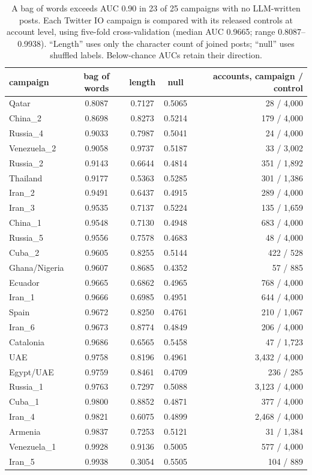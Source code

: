 \documentclass[10pt,a4paper]{article}
\begin{document}
\begin{table}[t]\centering\small
\begin{tabular}{lcccr}
\toprule
campaign & bag of words & length & null & accounts, campaign / control \\
\midrule
Qatar           & 0.8087 & 0.7127 & 0.5065 & 28 / 4,000 \\
China\_2        & 0.8698 & 0.8273 & 0.5214 & 179 / 4,000 \\
Russia\_4       & 0.9033 & 0.7987 & 0.5041 & 24 / 4,000 \\
Venezuela\_2    & 0.9058 & 0.9737 & 0.5187 & 33 / 3,002 \\
Russia\_2       & 0.9143 & 0.6644 & 0.4814 & 351 / 1,892 \\
Thailand        & 0.9177 & 0.5363 & 0.5285 & 301 / 1,386 \\
Iran\_2         & 0.9491 & 0.6437 & 0.4915 & 289 / 4,000 \\
Iran\_3         & 0.9535 & 0.7137 & 0.5224 & 135 / 1,659 \\
China\_1        & 0.9548 & 0.7130 & 0.4948 & 683 / 4,000 \\
Russia\_5       & 0.9556 & 0.7578 & 0.4683 & 48 / 4,000 \\
Cuba\_2         & 0.9605 & 0.8255 & 0.5144 & 422 / 528 \\
Ghana/Nigeria   & 0.9607 & 0.8685 & 0.4352 & 57 / 885 \\
Ecuador         & 0.9665 & 0.6862 & 0.4965 & 768 / 4,000 \\
Iran\_1         & 0.9666 & 0.6985 & 0.4951 & 644 / 4,000 \\
Spain           & 0.9672 & 0.8250 & 0.4761 & 210 / 1,067 \\
Iran\_6         & 0.9673 & 0.8774 & 0.4849 & 206 / 4,000 \\
Catalonia       & 0.9686 & 0.6565 & 0.5458 & 47 / 1,723 \\
UAE             & 0.9758 & 0.8196 & 0.4961 & 3,432 / 4,000 \\
Egypt/UAE       & 0.9759 & 0.8461 & 0.4709 & 236 / 285 \\
Russia\_1       & 0.9763 & 0.7297 & 0.5088 & 3,123 / 4,000 \\
Cuba\_1         & 0.9800 & 0.8852 & 0.4871 & 377 / 4,000 \\
Iran\_4         & 0.9821 & 0.6075 & 0.4899 & 2,468 / 4,000 \\
Armenia         & 0.9837 & 0.7253 & 0.5121 & 31 / 1,384 \\
Venezuela\_1    & 0.9928 & 0.9136 & 0.5005 & 577 / 4,000 \\
Iran\_5         & 0.9938 & 0.3054 & 0.5505 & 104 / 889 \\
\bottomrule
\end{tabular}
\caption{A bag of words exceeds AUC 0.90 in 23 of 25 campaigns with no LLM-written posts.
Each Twitter IO campaign is compared with its released controls at account level, using five-fold
  cross-validation (median AUC 0.9665; range 0.8087--0.9938).
``Length'' uses only the character count of joined posts; ``null'' uses shuffled labels.
Below-chance AUCs retain their direction.}
\label{tab:io}
\end{table}
\end{document}

